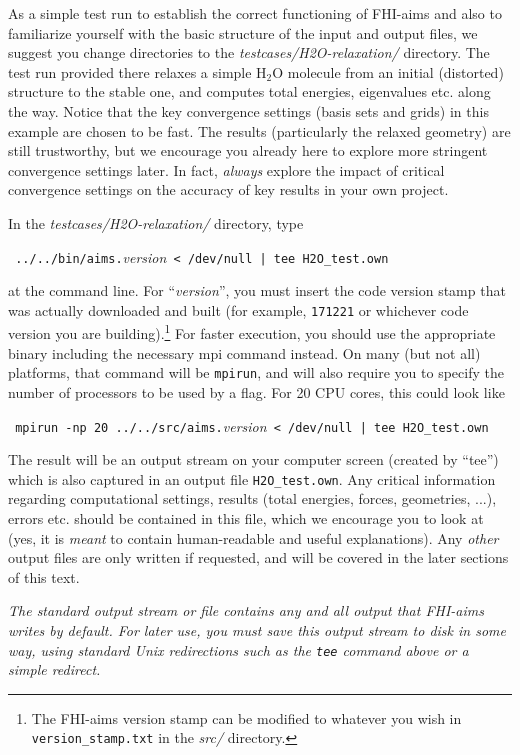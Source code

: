 As a simple test run to establish the correct functioning of FHI-aims and also
to familiarize yourself with the basic structure of the input and output
files, we suggest you change directories to the
\emph{testcases/H2O-relaxation/} directory. The test run provided there relaxes
a simple H$_2$O molecule from an initial (distorted) structure to the stable
one, and computes total energies, eigenvalues etc. along the way. Notice that
the key convergence settings (basis sets and grids) in this example are chosen
to be fast. The results (particularly the relaxed geometry) are still
trustworthy, but we encourage you already here to explore more
stringent convergence settings later. In fact, \emph{always} explore the
impact of critical convergence settings on the accuracy of key results in your
own project.

In the \emph{testcases/H2O-relaxation/} directory, type

{
  \verb+ ../../bin/aims.+\emph{version}\verb+ < /dev/null | tee H2O_test.own+
}

at the command line. For ``\emph{version}'', you must insert the code version stamp 
that was actually downloaded and built (for example, \verb+171221+ or
whichever code version you are building).\footnote{The  
FHI-aims version stamp can be modified to whatever you wish in
\texttt{version\_stamp.txt} in the \emph{src/} directory.} 
For faster execution, you should use the appropriate binary including the necessary mpi command
instead. On many (but not all) platforms, that command will be
\texttt{mpirun}, and will also require you to specify the number of processors
to be used by a flag. For 20
CPU cores, this could look like

{
  \verb+ mpirun -np 20 ../../src/aims.+\emph{version}\verb+ < /dev/null | tee H2O_test.own+
}

The result will be an output stream on your computer screen (created by
``tee'') which is also captured in an output file \texttt{H2O\_test.own}. 
Any critical information regarding computational
settings, results (total energies, forces, geometries, ...), errors
etc. should be contained in this file, which we encourage you to look at (yes,
it is \emph{meant} to contain human-readable and useful explanations). Any \emph{other} output files are  
only written if requested, and will be covered in the later sections of this
text.

\begin{center}
  \parbox[c]{0.8\textwidth}
  {
  \emph{The standard output stream or file contains any and all output that FHI-aims
  writes by default. For later use, you must save this output stream to disk in some way, 
  using standard Unix redirections such as the \texttt{tee} command above or a simple 
  redirect.}
  }
\end{center}

